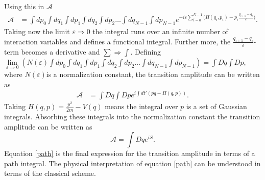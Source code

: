 Using this in $\mathcal{A}$
\begin{equation}
	\begin{split}
		\mathcal{A}&=\int dp_0\int dq_1 \int dp_1 \int dq_2  \int dp_2\dots \int dq_{N-1} \int dp_{N-1}e^{-i\varepsilon\sum_{i=0}^{N-1}\big(H(q_i,p_i)-p_i\frac{q_{i+1}-q_i}{\varepsilon}\big)}.
	\end{split}
\end{equation} 
Taking now the limit $\varepsilon\Rightarrow 0$ the integral runs over an infinite number of interaction variables and defines a functional integral. Further more, the $\frac{q_{i+1}-q_i}{\varepsilon}$-term becomes a derivative and $\sum\Rightarrow \int$. Defining $\lim\limits_{\varepsilon\Rightarrow 0}(N(\varepsilon)\int dp_0\int dq_1 \int dp_1 \int dq_2  \int dp_2\dots \int dq_{N-1} \int dp_{N-1})= \int Dq\int Dp$, where $N(\varepsilon)$\normalsize is a normalization constant, the transition amplitude can be written as
\begin{equation}
	\begin{split}
		\mathcal{A}&=\int Dq \int Dp e^{i\int dt'(p\dot{q}-H(q,p))}.
	\end{split}
\end{equation} 
Taking $H(q,p)=\frac{p^2}{2m}-V(q)$ means the integral over $p$ is a set of Gaussian integrals. Absorbing these integrals into the normalization constant the transition amplitude can be written as
\begin{equation}
	\mathcal{A}=\int Dq e^{iS}.
	\label{path}
\end{equation} 
Equation \eqref{path} is the final expression for the transition amplitude in terms of a path integral. The physical interpretation of equation \eqref{path} can be understood in terms of the classical scheme.

